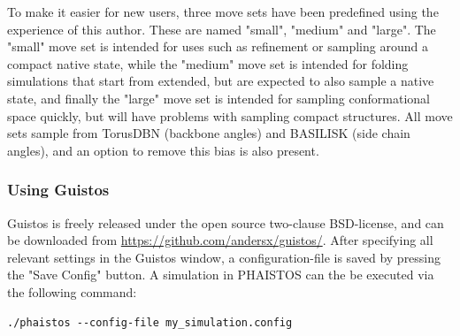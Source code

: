To make it easier for new users, three move sets have been predefined using the experience of this author.
These are named "small", "medium" and "large".
The "small" move set is intended for uses such as refinement or sampling around a compact native state, 
while the "medium" move set is intended for folding simulations that start from extended, but are expected to also sample a native state, 
and finally the "large" move set is intended for sampling conformational space quickly, but will have problems with sampling compact structures.
All move sets sample from TorusDBN (backbone angles) and BASILISK (side chain angles), and an option to remove this bias is also present.

\subsubsection{Using Guistos}

Guistos is freely released under the open source two-clause BSD-license, and can be downloaded from \url{https://github.com/andersx/guistos/}. After specifying all relevant settings in the Guistos window, a configuration-file is saved by pressing the "Save Config" button.
A simulation in PHAISTOS can the be executed via the following command:
\begin{lstlisting}
./phaistos --config-file my_simulation.config
\end{lstlisting}







